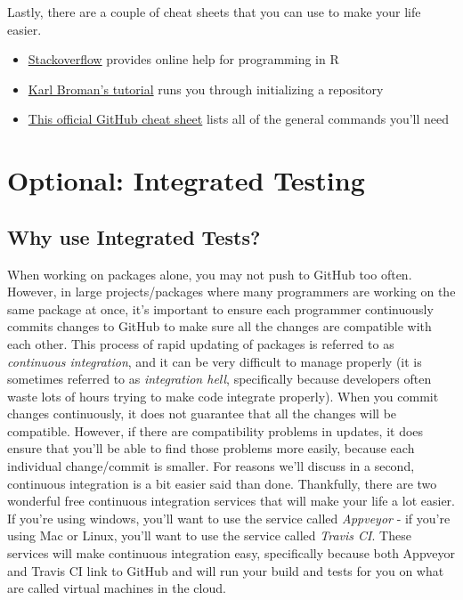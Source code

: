 \documentclass[]{book}
\begin{document}
Lastly, there are a couple of cheat sheets that you can use to make your
life easier.

\begin{itemize}
\item
  \href{https://stackoverflow.com/questions/tagged/r}{Stackoverflow}
  provides online help for programming in R
\item
  \href{http://kbroman.org/github_tutorial/pages/init.html}{Karl
  Broman's tutorial} runs you through initializing a repository
\item
  \href{https://github.github.com/training-kit/downloads/github-git-cheat-sheet.pdf}{This
  official GitHub cheat sheet} lists all of the general commands you'll
  need
\end{itemize}

\section{Optional: Integrated
Testing}\label{optional-integrated-testing}

\subsection{Why use Integrated Tests?}\label{why-use-integrated-tests}

When working on packages alone, you may not push to GitHub too often.
However, in large projects/packages where many programmers are working
on the same package at once, it's important to ensure each programmer
continuously commits changes to GitHub to make sure all the changes are
compatible with each other. This process of rapid updating of packages
is referred to as \emph{continuous integration}, and it can be very
difficult to manage properly (it is sometimes referred to as
\emph{integration hell}, specifically because developers often waste
lots of hours trying to make code integrate properly). When you commit
changes continuously, it does not guarantee that all the changes will be
compatible. However, if there are compatibility problems in updates, it
does ensure that you'll be able to find those problems more easily,
because each individual change/commit is smaller. For reasons we'll
discuss in a second, continuous integration is a bit easier said than
done. Thankfully, there are two wonderful free continuous integration
services that will make your life a lot easier. If you're using windows,
you'll want to use the service called \emph{Appveyor} - if you're using
Mac or Linux, you'll want to use the service called \emph{Travis CI}.
These services will make continuous integration easy, specifically
because both Appveyor and Travis CI link to GitHub and will run your
build and tests for you on what are called virtual machines in the
cloud.
\end{document}
